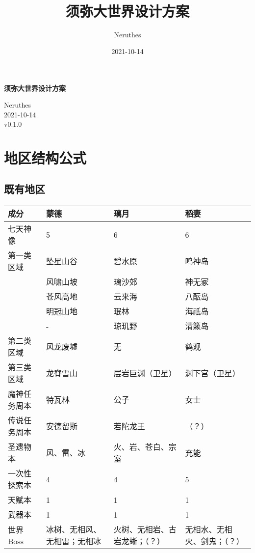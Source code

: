 \documentclass[a4paper,11pt]{article}
\title{须弥大世界设计方案}
\author{Neruthes}
\date{2021-10-14}
\begin{document}
    \pagestyle{empty}
    \sffamily
    \raggedright
    \raggedbottom

    \begin{titlepage}
        \center
        \hspace{1pt}
        \vspace{100pt}

        \huge\bfseries
        须弥大世界设计方案

        \vspace{100pt}
        \normalsize\mdseries\rmfamily
        Neruthes\\
        2021-10-14\\
        v0.1.0
    \end{titlepage}





    \section{地区结构公式}

    \subsection{既有地区}
    \begin{tabu} {|X|X|X|X|}
        \hline
        成分 & 蒙德 & 璃月 & 稻妻 \\
        \hline
        七天神像 & 5 & 6 & 6 \\
        \hline
        第一类区域 & 坠星山谷 & 碧水原 & 鸣神岛 \\
        {      } &  风啸山坡 & 璃沙郊 & 神无冢 \\
        {      } &  苍风高地 & 云来海 & 八酝岛 \\
        {      } &  明冠山地 & 珉林 & 海祇岛 \\
        {      } &  -       & 琼玑野 & 清籁岛 \\
        \hline
        第二类区域 & 风龙废墟 & 无 & 鹤观 \\
        \hline
        第三类区域 & 龙脊雪山 & 层岩巨渊（卫星） & 渊下宫（卫星） \\
        \hline
        魔神任务周本 & 特瓦林 & 公子 & 女士 \\
        传说任务周本 & 安德留斯 & 若陀龙王 & （？） \\
        \hline
        圣遗物本 & 风、雷、冰 & 火、岩、苍白、宗室 & 充能 \\
        一次性探索本 & 4 & 4 & 5 \\
        天赋本 & 1 & 1 & 1 \\
        武器本 & 1 & 1 & 1 \\
        \hline
        世界 Boss & 冰树、无相风、无相雷；无相冰 & 火树、无相岩、古岩龙蜥；（？） & 无相水、无相火、剑鬼；（？） \\
        \hline
    \end{tabu}
\end{document}
